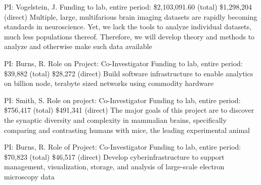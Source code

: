 \documentclass[10pt,colorlinks=true,urlcolor=blue]{moderncv}
\begin{document}
    {\newline PI: Vogelstein, J.
    \newline Funding to lab, entire period: \$2,103,091.60 (total) \$1,298,204 (direct)
    \newline Multiple, large, multifarious brain imaging datasets are rapidly becoming standards in
    neuroscience. Yet, we lack the tools to analyze individual datasets, much less
    populations thereof. Therefore, we will develop theory and methods to analyze and
    otherwise make such data available}{}{}{}
    
    {\newline PI: Burns, R.
    \newline Role on Project: Co-Investigator
    \newline Funding to lab, entire period: \$39,882 (total) \$28,272 (direct)
    \newline Build software infrastructure to enable analytics on billion node, terabyte sized networks
    using commodity hardware}{}{}{}
    
    {\newline PI: Smith, S.
    \newline Role on project: Co-Investigator
    \newline Funding to lab, entire period: \$756,417 (total) \$491,341 (direct)
    \newline The major goals of this project are to discover the synaptic diversity and complexity in
    mammalian brains, specifically comparing and contrasting humans with mice, the leading
    experimental animal}{}{}{}
    
    {\newline PI: Burns, R.
    \newline Role of Project: Co-Investigator
    \newline Funding to lab, entire period: \$70,823 (total) \$46,517 (direct)
    \newline Develop cyberinfrastructure to support management, visualization, storage, and analysis
    of large-scale electron microscopy data}{}{}{}{}
    
\end{document}
